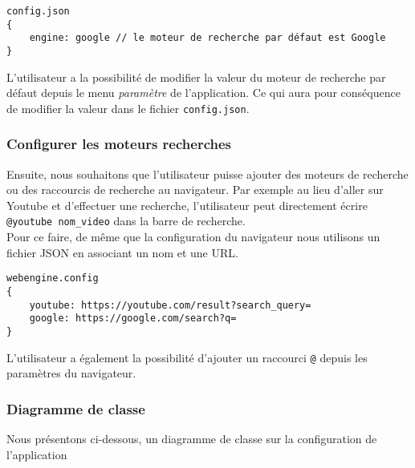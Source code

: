 \documentclass[10pt,a4paper]{article}
\begin{document}
\begin{verbatim}
config.json
{
    engine: google // le moteur de recherche par défaut est Google
}
\end{verbatim}

L'utilisateur a la possibilité de modifier la valeur du moteur de recherche par défaut depuis le menu \textit{paramètre} de l'application. Ce qui aura pour conséquence de modifier la valeur dans le fichier \verb|config.json|.

\subsubsection{Configurer les moteurs recherches}
Ensuite, nous souhaitons que l'utilisateur puisse ajouter des moteurs de recherche ou des raccourcis de recherche au navigateur. Par exemple au lieu d'aller sur Youtube et d'effectuer une recherche, l'utilisateur peut directement écrire \verb|@youtube nom_video| dans la barre de recherche. \\
Pour ce faire, de même que la configuration du navigateur nous utilisons un fichier JSON en associant un nom et une URL.
\begin{verbatim}
webengine.config
{
    youtube: https://youtube.com/result?search_query=
    google: https://google.com/search?q=
}
\end{verbatim}

L'utilisateur a également la possibilité d'ajouter un raccourci \verb|@| depuis les paramètres du navigateur.


\subsubsection{Diagramme de classe}
Nous présentons ci-dessous, un diagramme de classe sur la configuration de l'application
\end{document}
